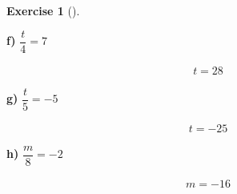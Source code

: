 \documentclass[
  letterpaper,
  DIV=11,
  numbers=noendperiod]{scrreprt}
\theoremstyle{definition}
\newtheorem{exercise}{Exercise}[chapter]
\theoremstyle{remark}
\begin{document}
\begin{exercise}[]
\begin{tcolorbox}
\textbf{f)} \(\displaystyle \dfrac{t}{4} = 7\)

\begin{align*}
t = 28
\end{align*}

\textbf{g)} \(\displaystyle \dfrac{t}{5} = -5\)

\begin{align*}
t = -25
\end{align*}

\textbf{h)} \(\displaystyle \dfrac{m}{8} = -2\)

\begin{align*}
m = -16
\end{align*}

\end{tcolorbox}

\end{exercise}
\end{document}
